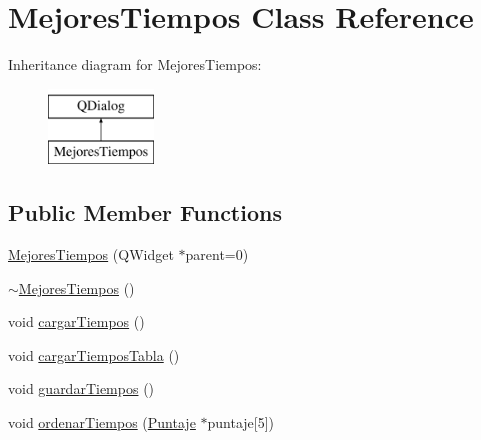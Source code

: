 \hypertarget{class_mejores_tiempos}{\section{Mejores\-Tiempos Class Reference}
\label{class_mejores_tiempos}
}
Inheritance diagram for Mejores\-Tiempos\-:\begin{figure}[H]
\begin{center}
\leavevmode
\includegraphics[height=2.000000cm]{class_mejores_tiempos}
\end{center}
\end{figure}
\subsection*{Public Member Functions}
\begin{DoxyCompactItemize}
\item 
\hyperlink{class_mejores_tiempos_a6546ee7792928377484fd761a2e31a01}{Mejores\-Tiempos} (Q\-Widget $\ast$parent=0)
\item 
\hyperlink{class_mejores_tiempos_ac58d13293a8c1905af830cd5e3afdf23}{$\sim$\-Mejores\-Tiempos} ()
\item 
void \hyperlink{class_mejores_tiempos_a7fd2c93312b0df3df68ede23333717c6}{cargar\-Tiempos} ()
\item 
void \hyperlink{class_mejores_tiempos_af32a4917d0f5fbd460f283111690cb5c}{cargar\-Tiempos\-Tabla} ()
\item 
void \hyperlink{class_mejores_tiempos_a23afacd185814cd56a846f9043f223b0}{guardar\-Tiempos} ()
\item 
void \hyperlink{class_mejores_tiempos_a0404cc7b33f26d1d112df3408a7c370c}{ordenar\-Tiempos} (\hyperlink{class_puntaje}{Puntaje} $\ast$puntaje\mbox{[}5\mbox{]})
\end{DoxyCompactItemize}

